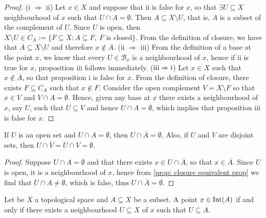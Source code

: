 \begin{proof}
(i \(\Rightarrow\) ii) Let \(x \in X\) and suppose that ii is false for \(x\),
so that \(\exists U \subseteq X\) neighbourhood of \(x\) such that \(U \cap A
= \emptyset\). Then \(A \subseteq X \setminus U\), that is, \(A\) is a subset
of the complement of \(U\). Since \(U\) is open, then \(X \setminus U \in C_A
:= \{F \subseteq X : A \subseteq F,\ F \text{ is closed}\}\). From the
definition of closure, we have that \(\overline A \subseteq X \setminus U\)
and therefore \(x \not\in \overline A\). (ii \(\Rightarrow\) iii) From the
definition of a base at the point \(x\), we know that every \(U \in \mathcal
B_x\) is a neighbourhood of \(x\), hence if ii is true for \(x\), proposition
iii follows immediately. (\(\text{iii} \Rightarrow \text i\)) Let \(x \in X\)
such that \(x \not\in \overline A\), so that proposition i is false for \(x\).
From the definition of closure, there exists \(F \subseteq C_A\) such that \(x
\not\in F\). Consider the open complement \(V = X \setminus F\) so that \(x
\in V\) and \(V \cap A = \emptyset\). Hence, given any base at \(x\) there
exists a neighbourhood of \(x\), say \(U\), such that \(U \subseteq V\) and
hence \(U \cap A = \emptyset\), which implies that proposition iii is false
for \(x\).
\end{proof}

\begin{corollary}\label{cor: disjoint closure persistence}
If \(U\) is an open set and \(U \cap A = \emptyset\), then \(U \cap \overline
A = \emptyset\). Also, if \(U\) and \(V\) are disjoint sets, then \(U \cap
\overline V = \overline U \cap V = \emptyset\).
\end{corollary}

\begin{proof}
Suppose \(U \cap A = \emptyset\) and that there exists \(x \in U \cap
\overline A\), so that \(x \in \overline A\). Since \(U\) is open, it
is a neighbourhood of \(x\), hence from \cref{prop: closure equivalent prop}
we find that \(U \cap A \neq \emptyset\), which is false, thus \(U \cap
\overline A = \emptyset\).
\end{proof}

\begin{proposition}\label{prop: open set nbhd criterion}
Let be \(X\) a topological space and \(A \subseteq X\) be a subset. A point
\(x \in \operatorname{Int}(A)\) if and only if there exists a neighbourhood \(U \subseteq
X\) of \(x\) such that \(U \subseteq A\).
\end{proposition}

